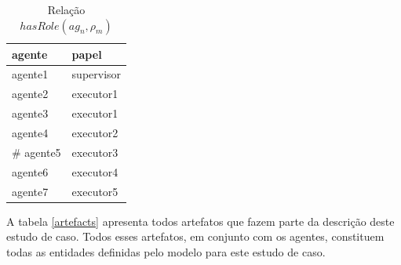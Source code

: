 \documentclass[12pt]{article}
\begin{document}
\begin{table}[H]
\centering
\begin{tabular}{|l|l|}
\hline
\textbf{agente} & \textbf{papel} \\ \hline
agente1 & supervisor \\ \hline
agente2 & executor1 \\ \hline
agente3 & executor1 \\ \hline
agente4 & executor2 \\ \hline#
agente5 & executor3 \\ \hline
agente6 & executor4 \\ \hline
agente7 & executor5 \\ \hline
\end{tabular}
\caption{Relação $hasRole(ag_n,\rho_m)$}
\label{agentsroles}
\end{table}

A tabela \ref{artefacts} apresenta todos artefatos que fazem parte da descrição deste estudo de caso. Todos esses artefatos, em conjunto com os agentes, constituem todas as entidades definidas pelo modelo para este estudo de caso.
\end{document}
